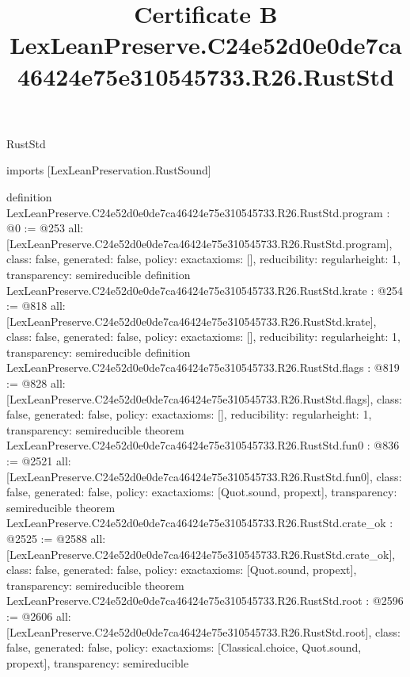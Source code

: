 \begin{lexlean}{RustStd}
\title{Certificate B LexLeanPreserve.C24e52d0e0de7ca46424e75e310545733.R26.RustStd}
\begin{coremodule}
imports [LexLeanPreservation.RustSound]

definition LexLeanPreserve.C24e52d0e0de7ca46424e75e310545733.R26.RustStd.program : @0 := @253 {
  all: [LexLeanPreserve.C24e52d0e0de7ca46424e75e310545733.R26.RustStd.program],
  class: false,
  generated: false,
  policy: exact{axioms: []},
  reducibility: regular{height: 1},
  transparency: semireducible
}
definition LexLeanPreserve.C24e52d0e0de7ca46424e75e310545733.R26.RustStd.krate : @254 := @818 {
  all: [LexLeanPreserve.C24e52d0e0de7ca46424e75e310545733.R26.RustStd.krate],
  class: false,
  generated: false,
  policy: exact{axioms: []},
  reducibility: regular{height: 1},
  transparency: semireducible
}
definition LexLeanPreserve.C24e52d0e0de7ca46424e75e310545733.R26.RustStd.flags : @819 := @828 {
  all: [LexLeanPreserve.C24e52d0e0de7ca46424e75e310545733.R26.RustStd.flags],
  class: false,
  generated: false,
  policy: exact{axioms: []},
  reducibility: regular{height: 1},
  transparency: semireducible
}
theorem LexLeanPreserve.C24e52d0e0de7ca46424e75e310545733.R26.RustStd.fun0 : @836 := @2521 {
  all: [LexLeanPreserve.C24e52d0e0de7ca46424e75e310545733.R26.RustStd.fun0],
  class: false,
  generated: false,
  policy: exact{axioms: [Quot.sound, propext]},
  transparency: semireducible
}
theorem LexLeanPreserve.C24e52d0e0de7ca46424e75e310545733.R26.RustStd.crate_ok : @2525 := @2588 {
  all: [LexLeanPreserve.C24e52d0e0de7ca46424e75e310545733.R26.RustStd.crate_ok],
  class: false,
  generated: false,
  policy: exact{axioms: [Quot.sound, propext]},
  transparency: semireducible
}
theorem LexLeanPreserve.C24e52d0e0de7ca46424e75e310545733.R26.RustStd.root : @2596 := @2606 {
  all: [LexLeanPreserve.C24e52d0e0de7ca46424e75e310545733.R26.RustStd.root],
  class: false,
  generated: false,
  policy: exact{axioms: [Classical.choice, Quot.sound, propext]},
  transparency: semireducible
}


\end{coremodule}
\end{lexlean}
